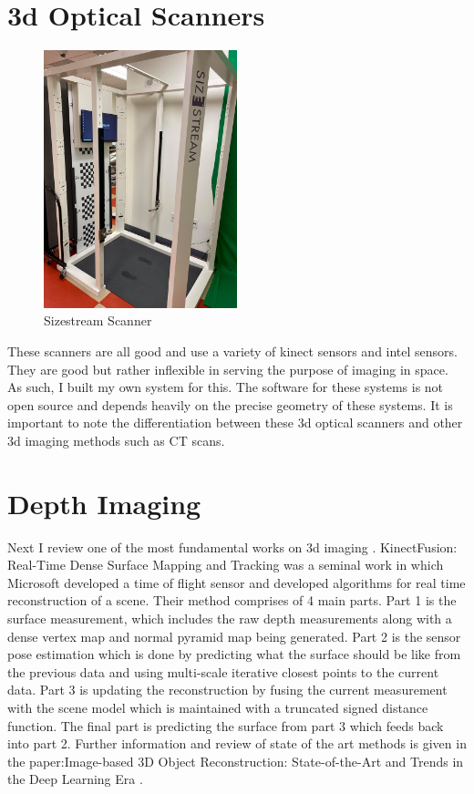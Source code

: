 \section{3d Optical Scanners}
\begin{figure}[!htb]
	\caption{Sizestream Scanner}
	\centering
	\includegraphics[width=0.5\textwidth]{images/sizestream.jpg}
\end{figure}

These scanners are all good and use a variety of kinect sensors and intel sensors.
They are good but rather inflexible in serving the purpose of imaging in space. As such, I built my own system for this. The software for these systems is not open source and depends heavily on the precise geometry of these systems. It is important to note the differentiation between these 3d optical scanners and other 3d imaging methods such as CT scans.

\section{Depth Imaging}

Next I review one of the most fundamental works on 3d imaging \cite{izadi2011kinectfusion}. KinectFusion: Real-Time Dense Surface Mapping and Tracking was a seminal work in which Microsoft developed a time of flight sensor and developed algorithms for real time reconstruction of a scene. Their method comprises of 4 main parts. Part 1 is the surface measurement, which includes the raw depth measurements along with a dense vertex map and normal pyramid map being generated. Part 2 is the sensor pose estimation which is done by predicting what the surface should be like from the previous data and using multi-scale iterative closest points to the current data. Part 3 is updating the reconstruction by fusing the current measurement with the scene model which is maintained with a truncated signed distance function. The final part is predicting the surface from part 3 which feeds back into part 2.
Further information and review of state of the art methods is given in the paper:Image-based 3D Object Reconstruction: State-of-the-Art and Trends in the Deep Learning Era \cite{DBLP:journals/corr/abs-1906-06543}.

